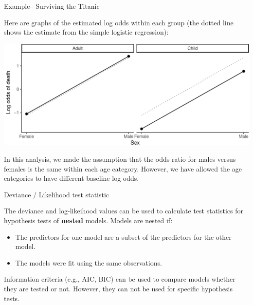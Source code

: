 \documentclass[ignorenonframetext,]{beamer}
\providecommand{\tightlist}{%
  \setlength{\itemsep}{0pt}\setlength{\parskip}{0pt}}
\begin{document}
\begin{frame}{Example-- Surviving the Titanic}

Here are graphs of the estimated log odds within each group (the dotted
line shows the estimate from the simple logistic regression):

\includegraphics{regression_files/figure-beamer/unnamed-chunk-11-1.pdf}

In this analysis, we made the assumption that the odds ratio for males
versus females is the same within each age category. However, we have
allowed the age categories to have different baseline log odds.

\end{frame}

\begin{frame}{Deviance / Likelihood test statistic}

The deviance and log-likeihood values can be used to calculate test
statistics for hypothesis tests of \textbf{nested} models. Models are
nested if:

\begin{itemize}
\tightlist
\item
  The predictors for one model are a subset of the predictors for the
  other model.
\item
  The models were fit using the same observations.
\end{itemize}

Information criteria (e.g., AIC, BIC) can be used to compare models
whether they are tested or not. However, they can not be used for
specific hypothesis tests.

\end{frame}
\end{document}

